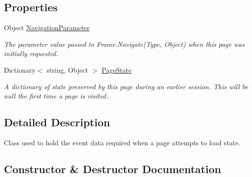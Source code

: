 \subsection*{Properties}
\begin{DoxyCompactItemize}
\item 
Object \hyperlink{class_listen_to_me_1_1_common_1_1_load_state_event_args_add0d03462ba6a8b6dba47a959fe96f42}{Navigation\+Parameter}
\begin{DoxyCompactList}\small\item\em The parameter value passed to Frame.\+Navigate(\+Type, Object) when this page was initially requested. \end{DoxyCompactList}\item 
Dictionary$<$ string, Object $>$ \hyperlink{class_listen_to_me_1_1_common_1_1_load_state_event_args_a2161ed99554b07abe1f6c743db81835e}{Page\+State}
\begin{DoxyCompactList}\small\item\em A dictionary of state preserved by this page during an earlier session. This will be null the first time a page is visited. \end{DoxyCompactList}\end{DoxyCompactItemize}


\subsection{Detailed Description}
Class used to hold the event data required when a page attempts to load state. 



\subsection{Constructor \& Destructor Documentation}
